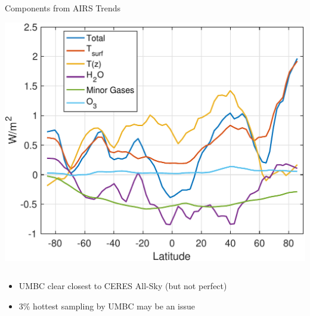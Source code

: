 \documentclass[10pt,t]{beamer}
\begin{document}
\begin{frame}
\begin{columns}
\begin{column}{0.5\columnwidth}
\begin{block}{\small Components from AIRS Trends}
\vspace{-0.1in}
\begin{center}
\includegraphics[width=\linewidth]{SunClimate2022/umbc_olr_components.pdf}
\end{center}
\end{block}
\end{column}
\end{columns}

\vspace{-0.05in}

\begin{itemize}
\item UMBC clear closest to CERES All-Sky (but not perfect)
\item 3\% hottest sampling by UMBC may be an issue
\end{itemize}
\end{frame}
\end{document}
